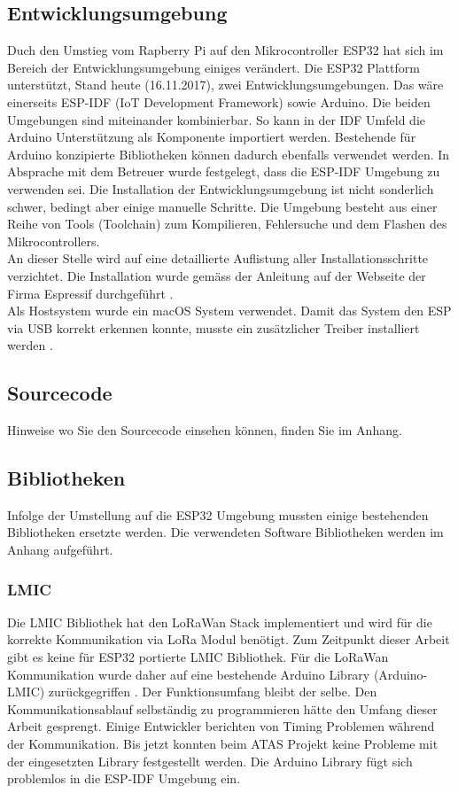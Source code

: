 \documentclass[11pt,english,german]{report}
\theoremstyle{definition}
\begin{document}
\subsection{Entwicklungsumgebung}
Duch den Umstieg vom Rapberry Pi auf den Mikrocontroller ESP32 hat sich im Bereich der Entwicklungsumgebung einiges verändert. Die ESP32 Plattform unterstützt, Stand heute (16.11.2017), zwei Entwicklungsumgebungen. Das wäre einerseits ESP-IDF (IoT Development Framework) sowie Arduino\cite{espidfarduino}. Die beiden Umgebungen sind miteinander kombinierbar. So kann in der IDF Umfeld die Arduino Unterstützung als Komponente importiert werden. Bestehende für Arduino konzipierte Bibliotheken können dadurch ebenfalls verwendet werden. In Absprache mit dem Betreuer wurde festgelegt, dass die ESP-IDF Umgebung zu verwenden sei. Die Installation der Entwicklungsumgebung ist nicht sonderlich schwer, bedingt aber einige manuelle Schritte. Die Umgebung besteht aus einer Reihe von Tools (Toolchain) zum Kompilieren, Fehlersuche und dem Flashen des Mikrocontrollers.\\[0.3cm]
An dieser Stelle wird auf eine detaillierte Auflistung aller Installationsschritte verzichtet. Die Installation wurde gemäss der Anleitung auf der Webseite der Firma Espressif durchgeführt \cite{espidfinstallation}.\\[0.3cm]
Als Hostsystem wurde ein macOS System verwendet. Damit das System den ESP via USB korrekt erkennen konnte, musste ein zusätzlicher Treiber installiert werden \cite{espidfdriver}. 

\subsection{Sourcecode}
Hinweise wo Sie den Sourcecode einsehen können, finden Sie im Anhang.

\newpage

\subsection{Bibliotheken}
Infolge der Umstellung auf die ESP32 Umgebung mussten einige bestehenden Bibliotheken ersetzte werden. Die verwendeten Software Bibliotheken werden im Anhang aufgeführt.

\subsubsection{LMIC}
Die LMIC Bibliothek hat den LoRaWan Stack implementiert und wird für die korrekte Kommunikation via LoRa Modul benötigt. Zum Zeitpunkt dieser Arbeit gibt es keine für ESP32 portierte LMIC Bibliothek. Für die LoRaWan Kommunikation wurde daher auf eine bestehende Arduino Library (Arduino-LMIC) zurückgegriffen \cite{ArduinoLMIC}. Der Funktionsumfang bleibt der selbe. Den Kommunikationsablauf selbständig zu programmieren hätte den Umfang dieser Arbeit gesprengt. Einige Entwickler berichten von Timing Problemen während der Kommunikation. Bis jetzt konnten beim ATAS Projekt keine Probleme mit der eingesetzten Library festgestellt werden. Die Arduino Library fügt sich problemlos in die ESP-IDF Umgebung ein.
\end{document}
